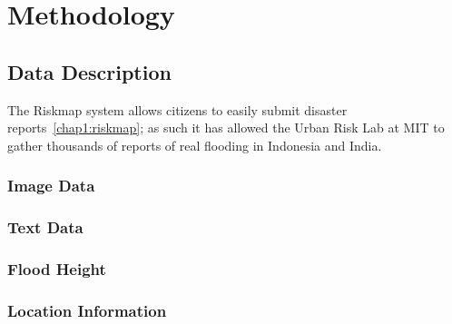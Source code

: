 \chapter{Methodology}
\section{Data Description}
The Riskmap system allows citizens to easily submit 
disaster reports~\ref{chap1:riskmap}; as such it has allowed the Urban Risk Lab at
MIT to gather thousands of reports of real flooding in Indonesia and India.

\subsection{Image Data}

\subsection{Text Data}
\subsection{Flood Height}
\subsection{Location Information}

